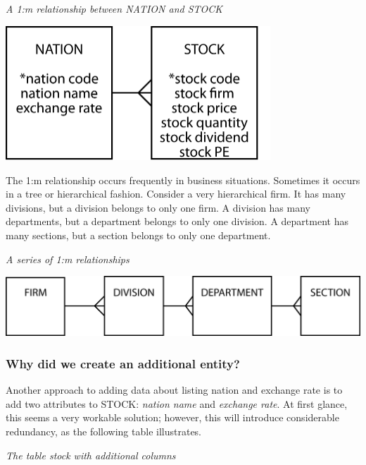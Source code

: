 \documentclass[
]{article}
\begin{document}
\emph{A 1:m relationship between NATION and STOCK}

\includegraphics[width=3.91667in,height=\textheight]{Figures/Chapter 4/nation-stock.png}

The 1:m relationship occurs frequently in business situations. Sometimes
it occurs in a tree or hierarchical fashion. Consider a very
hierarchical firm. It has many divisions, but a division belongs to only
one firm. A division has many departments, but a department belongs to
only one division. A department has many sections, but a section belongs
to only one department.

\emph{A series of 1:m relationships}

\includegraphics{Figures/Chapter 4/hierarchy.png}

\hypertarget{why-did-we-create-an-additional-entity}{%
\subsubsection*{Why did we create an additional entity?}\label{why-did-we-create-an-additional-entity}}

Another approach to adding data about listing nation and exchange rate
is to add two attributes to STOCK: \emph{nation name} and \emph{exchange rate}. At
first glance, this seems a very workable solution; however, this will
introduce considerable redundancy, as the following table illustrates.

\emph{The table stock with additional columns}
\end{document}
